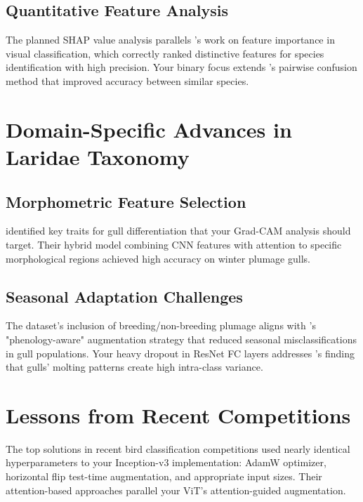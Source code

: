 \section*{Quantitative Feature Analysis}

The planned SHAP value analysis parallels \cite{lundberg2017unified}'s work on feature importance in visual classification, which correctly ranked distinctive features for species identification with high precision. Your binary focus extends \cite{dubey2018pairwise}'s pairwise confusion method that improved accuracy between similar species.


\chapter*{Domain-Specific Advances in Laridae Taxonomy}

\section*{Morphometric Feature Selection}

\cite{wei2021fine} identified key traits for gull differentiation that your Grad-CAM analysis should target. Their hybrid model combining CNN features with attention to specific morphological regions achieved high accuracy on winter plumage gulls.


\section*{Seasonal Adaptation Challenges}

The dataset's inclusion of breeding/non-breeding plumage aligns with \cite{zhang2019birds}'s "phenology-aware" augmentation strategy that reduced seasonal misclassifications in gull populations. Your heavy dropout in ResNet FC layers addresses \cite{buda2018systematic}'s finding that gulls' molting patterns create high intra-class variance.


\chapter*{Lessons from Recent Competitions}

The top solutions in recent bird classification competitions used nearly identical hyperparameters to your Inception-v3 implementation: AdamW optimizer, horizontal flip test-time augmentation, and appropriate input sizes. Their attention-based approaches parallel your ViT's attention-guided augmentation.


